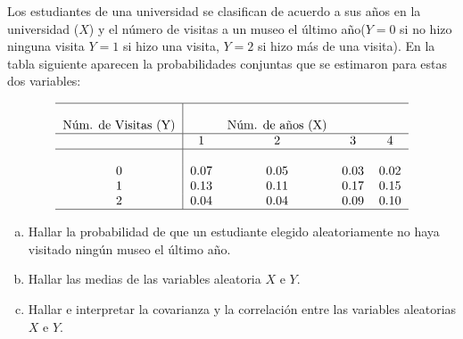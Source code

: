 \documentclass[12pt]{article}
\begin{document}
\begin{prob}
Los estudiantes de una universidad se clasifican de acuerdo a sus años en la universidad
($X$) y el número de visitas a un museo el último año($Y=0$ si no  hizo ninguna visita
$Y=1$ si hizo una visita, $Y=2$ si hizo más de una visita). En la tabla siguiente aparecen
la probabilidades conjuntas que se estimaron para estas dos variables:

    $$\begin{tabular}{c|cccc}
        \hline\\
        Núm. de Visitas (Y) & &Núm. de años (X) & & \\
        \hline
          & 1& 2 & 3  & 4 \\
         \hline\\
         0 & 0.07 & 0.05 & 0.03 & 0.02\\
         1 & 0.13 & 0.11 & 0.17 & 0.15\\
         2 & 0.04 & 0.04 & 0.09 & 0.10\\
         \hline
        \end{tabular}
        $$
        \begin{enumerate}[a)]
            \item Hallar la probabilidad de que un estudiante elegido
            aleatoriamente no haya visitado ningún museo el último año.
            \item Hallar las medias de las variables aleatoria $X$ e $Y$.
            \item Hallar e interpretar la covarianza y la correlación
            entre las variables aleatorias $X$ e $Y$.
            \end{enumerate}
        \end{prob}
\end{document}
